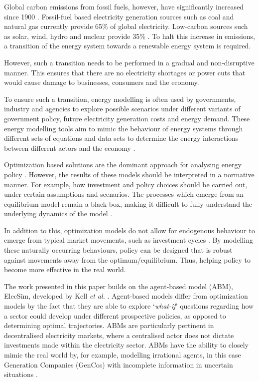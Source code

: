 Global carbon emissions from fossil fuels, however, have significantly increased since 1900 \cite{boden2017global}.    Fossil-fuel based electricity generation sources such as coal and natural gas currently provide 65\% of global electricity. Low-carbon sources such as solar, wind, hydro and nuclear provide 35\% \cite{BP2018}. To halt this increase in  emissions, a transition of the energy system towards a renewable energy system is required. 

However, such a transition needs to be performed in a gradual and non-disruptive manner. This ensures that there are no electricity shortages or power cuts that would cause damage to businesses, consumers and the economy. 

To ensure such a transition, energy modelling is often used by governments, industry and agencies to explore possible scenarios under different variants of government policy, future electricity generation costs and energy demand. These energy modelling tools aim to mimic the behaviour of energy systems through different sets of equations and data sets to determine the energy interactions between different actors and the economy \cite{Machado2019}.


Optimization based solutions are the dominant approach for analysing energy policy \cite{Chappin2017}. However, the results of these models should be interpreted in a normative manner. For example, how investment and policy choices should be carried out, under certain assumptions and scenarios. The processes which emerge from an equilibrium model remain a black-box, making it difficult to fully understand the underlying dynamics of the model \cite{Chappin2017}. 



In addition to this, optimization models do not allow for  endogenous behaviour to emerge from typical market movements, such as investment cycles \cite{Chappin2017, Gross2007}. By modelling these naturally occurring behaviours, policy can be designed that is robust against movements away from the optimum/equilibrium. Thus, helping policy to become more effective in the real world. 





The work presented in this paper builds on the agent-based model (ABM), ElecSim, developed by Kell \textit{et al.} \cite{Kell}. Agent-based models differ from optimization models by the fact that they are able to explore `\textit{what-if}' questions regarding how a sector could develop under different prospective policies, as opposed to determining optimal trajectories. ABMs are particularly pertinent in decentralised electricity markets, where a centralised actor does not dictate investments made within the electricity sector. ABMs have the ability to closely mimic the real world by, for example, modelling irrational agents, in this case Generation Companies (GenCos) with incomplete information in uncertain situations \cite{Ghorbani2014}. 

